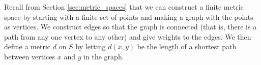 \begin{comment}

\ExerciseSolution Let $B = B(0,1)$ in $Y$. Notice that $f^{-1}(B) = \{(0,0)\}$. Now $B((0,0),r) = \{x \in \R^2 \mid |x|<r\}.$ So the only way $B((0,0),r) = f^{-1}(B)$ is if $r=0$. Thus, $f^{-1}(B)$ is not a neighborhood of $(0,0)$ and so $f$ is not continuous. 

Now we show that $g$ is continuous. Let $a = (a_1,a_2) \in X$. We demonstrate that $g$ is continuous at $a$. By the definition of $g$, we either have $g(a) = 0$ or $g(a) = 1$. We consider the cases.
\begin{description}
\item[Case 1: $g(a) = 0$.] In this case we have $|a| < 1$. Let $B = B(g(a),\epsilon) = B(0,\epsilon) = (-\epsilon, \epsilon)$. Let $\delta = \frac{3|a|}{2}$. If $x$ is in $B(a,\delta)$, then 
\begin{align*}
d_H(a,x) &< \delta \\
|a|+|x| &<  \frac{3|a|}{2} \\
|x| &< \frac{|a|}{2} < 1.
\end{align*}
So we must have $g(x) = 0$ as well. Thus,
\[|g(a) - g(x)| = |0-0|  = 0 <  \epsilon.\]
We conclude that $g$ is continuous at $a$ when $g(a) = 0$. 
    
\item[Case 2: $g(a) = 1$.] Here we have $|a| \geq 1$. Let $\delta = |a|$. If $x$ is in $B(a,\delta)$, then 
\begin{align*}
d_H(a,x) &< \delta \\
|a|+|x| &<  |a| \\
|x| < 0.
\end{align*}
But then $B(a,\delta) = \{a\}$ and $B(a,\delta) \subseteq g^{-1}(B(g(a),\epsilon)$. We conclude that $g$ is continuous at $a$ when $g(a) = 1$. 
\end{description} 

\end{comment}

\item Recall from Section \ref{sec:metric_spaces} that we can construct a finite metric space by starting with a finite set of points and making a graph with the points as vertices. We construct edges so that the graph is connected (that is, there is a path from any one vertex to any other) and give weights to the edges. We then define a metric $d$ on $S$ by letting $d(x,y)$ be the length of a shortest path between vertices $x$ and $y$ in the graph. \\

